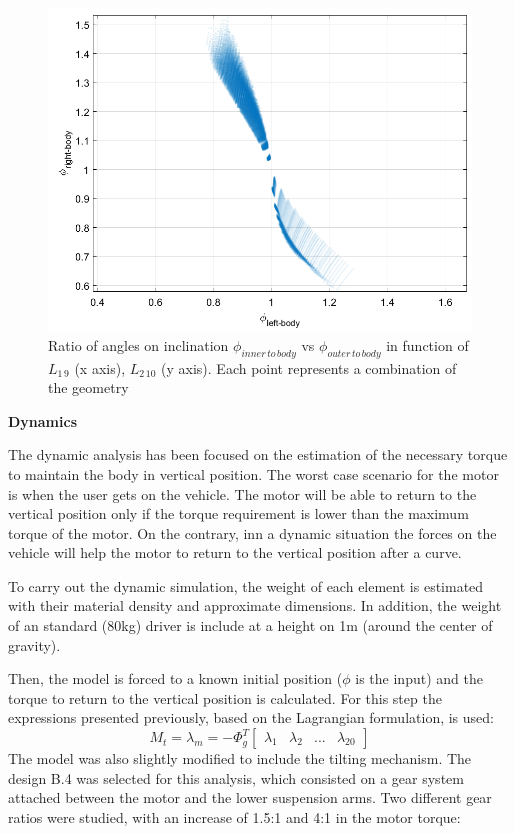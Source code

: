 \begin{figure}
	\includegraphics[width=1.0\linewidth]{figs/05/sim/PhiRelation}
	\caption{Ratio of angles on inclination $\phi_{inner\,to\,body}$ vs $\phi_{outer\,to\,body}$ in function of $L_{1\,9}$ (x axis), $L_{2\,10}$ (y axis). Each point represents a combination of the geometry}
	\label{phirelation}
\end{figure}

\textbf{Dynamics}

The dynamic analysis has been focused on the estimation of the necessary torque to maintain the body in vertical position. The worst case scenario for the motor is when the user gets on the vehicle. The motor will be able to return to the vertical position only if the torque requirement is lower than the maximum torque of the motor. On the contrary, inn a dynamic situation the forces on the vehicle will help the motor to return to the vertical position after a curve.

To carry out the dynamic simulation, the weight of each element is estimated with their material density and approximate dimensions. In addition, the weight of an standard (80kg) driver is include at a height on 1m (around the center of gravity).

Then, the model is forced to a known initial position ($\phi$ is the input) and the torque to return to the vertical position is calculated. For this step the expressions presented previously, based on the Lagrangian formulation, is used:\[M_{t}=\lambda_{m}=-\Phi_{g}^{T} \begin{bmatrix} \lambda_{1} & \lambda_{2} & ... &  \lambda_{20} \end{bmatrix}\]
The model was also slightly modified to include the tilting mechanism. The design B.4 was selected for this analysis, which consisted on a gear system attached between the motor and the lower suspension arms. Two different gear ratios were studied, with an increase of 1.5:1 and 4:1 in the motor torque:


